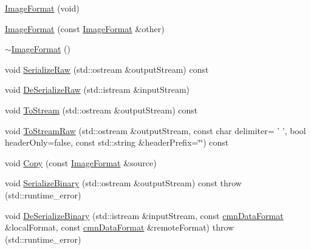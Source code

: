 \begin{DoxyCompactItemize}
\item 
\hyperlink{classsvl_filter_source_video_capture_types_1_1_image_format_ad09aa5e85464b4721e083c80fb309d9d}{Image\-Format} (void)
\item 
\hyperlink{classsvl_filter_source_video_capture_types_1_1_image_format_afc3363d068b9f2a5ae39794b66453f44}{Image\-Format} (const \hyperlink{classsvl_filter_source_video_capture_types_1_1_image_format}{Image\-Format} \&other)
\item 
\hyperlink{classsvl_filter_source_video_capture_types_1_1_image_format_a1a6dfaefb3838e1c63aa950ceee54138}{$\sim$\-Image\-Format} ()
\item 
void \hyperlink{classsvl_filter_source_video_capture_types_1_1_image_format_a8e5d7d3bddd7faeffdea2a4c700c2ae3}{Serialize\-Raw} (std\-::ostream \&output\-Stream) const 
\item 
void \hyperlink{classsvl_filter_source_video_capture_types_1_1_image_format_a22c39a8837ef03908ed5c4c8ebc5d374}{De\-Serialize\-Raw} (std\-::istream \&input\-Stream)
\item 
void \hyperlink{classsvl_filter_source_video_capture_types_1_1_image_format_a4fd41abc52537412f26f06762f680a33}{To\-Stream} (std\-::ostream \&output\-Stream) const 
\item 
void \hyperlink{classsvl_filter_source_video_capture_types_1_1_image_format_a516e93bf9a3668002888d49992cd55af}{To\-Stream\-Raw} (std\-::ostream \&output\-Stream, const char delimiter= ' ', bool header\-Only=false, const std\-::string \&header\-Prefix=\char`\"{}\char`\"{}) const 
\item 
void \hyperlink{classsvl_filter_source_video_capture_types_1_1_image_format_a1f4f70055deccf48e610b642f6ce3019}{Copy} (const \hyperlink{classsvl_filter_source_video_capture_types_1_1_image_format}{Image\-Format} \&source)
\item 
void \hyperlink{classsvl_filter_source_video_capture_types_1_1_image_format_a68602d2348cca441cbc7a78464bf99d0}{Serialize\-Binary} (std\-::ostream \&output\-Stream) const   throw (std\-::runtime\-\_\-error)
\item 
void \hyperlink{classsvl_filter_source_video_capture_types_1_1_image_format_ad399aa52c8bf24bcf03da4c48749d156}{De\-Serialize\-Binary} (std\-::istream \&input\-Stream, const \hyperlink{classcmn_data_format}{cmn\-Data\-Format} \&local\-Format, const \hyperlink{classcmn_data_format}{cmn\-Data\-Format} \&remote\-Format)  throw (std\-::runtime\-\_\-error)
\item 

\end{DoxyCompactItemize}
